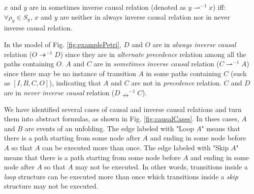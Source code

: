 \documentclass{llncs}
\begin{document}
\begin{definition}\label{def:sometimesInverseCausal}
$x$ and $y$ are in sometimes inverse causal relation (denoted as $y\rightharpoonup^{-1}x$) iff: $\forall\rho_{y}\in S_{y}$, $x$ and $y$ are neither in always inverse causal relation nor in never inverse causal relation.
\end{definition}

\begin{example}
In the model of Fig. \ref{fig:examplePetri}, $D$ and $O$ are in \textit{always inverse causal} relation ($O\twoheadrightarrow^{-1}D$) since they are in \textit{alternate precedence} relation among all the paths containing $O$. $A$ and $C$ are in \textit{sometimes inverse causal} relation ($C\rightharpoonup^{-1}A$) since there may be no instance of transition $A$ in some paths containing $C$ (such as $[I,B,C,O]$), indicating that $A$ and $C$ are not in \textit{precedence} relation. $C$ and $D$ are in \textit{never inverse causal} relation ($D\nrightarrow^{-1}C$).
\end{example}

We have identified several cases of causal and inverse causal relations and turn them into abstract formulas, as shown in Fig. \ref{fig:causalCases}. In thses cases, $A$ and $B$ are events of an unfolding. The edge labeled with "Loop $A$" means that there is a path starting from some node after $A$ and ending in some node before $A$ so that $A$ can be executed more than once. The edge labeled with "Skip $A$" means that there is a path starting from some node before $A$ and ending in some node after $A$ so that $A$ may not be executed. In other words, transitions inside a \textit{loop} structure can be executed more than once which transitions inside a \textit{skip} structure may not be executed.
\end{document}
